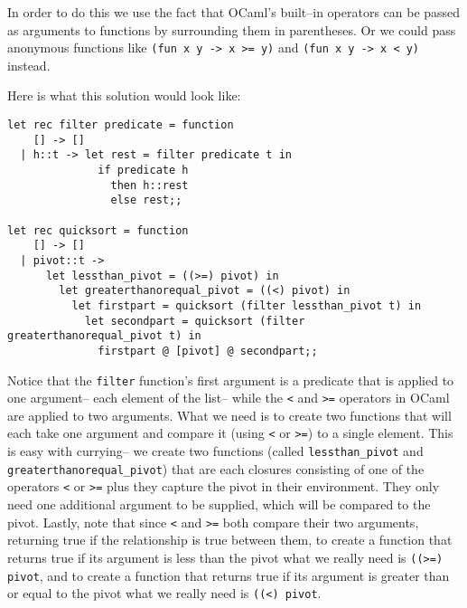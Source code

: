 \documentclass[11pt,fleqn]{article}
\begin{document}
\begin{enumerate}
          In order to do this we use the fact that OCaml's built--in
          operators can be passed as arguments to functions by surrounding
          them in parentheses.  Or we could pass anonymous functions like
          \texttt{(fun x y -> x >= y)} and \texttt{(fun x y -> x < y)}
          instead.

          Here is what this solution would look like:

          \vspace{-2.5mm}

          \begin{center}

            \begin{Verbatim}[gobble=0]
let rec filter predicate = function
    [] -> []
  | h::t -> let rest = filter predicate t in
              if predicate h
                then h::rest
                else rest;;

let rec quicksort = function
    [] -> []
  | pivot::t ->
      let lessthan_pivot = ((>=) pivot) in
        let greaterthanorequal_pivot = ((<) pivot) in
          let firstpart = quicksort (filter lessthan_pivot t) in
            let secondpart = quicksort (filter greaterthanorequal_pivot t) in
              firstpart @ [pivot] @ secondpart;;
            \end{Verbatim}

          \end{center}

          \vspace{-1mm}

          Notice that the \texttt{filter} function's first argument is a
          predicate that is applied to one argument-- each element of the
          list-- while the \texttt{<} and \texttt{>=} operators in OCaml are
          applied to two arguments.  What we need is to create two functions
          that will each take one argument and compare it (using \texttt{<}
          or \texttt{>=}) to a single element.  This is easy with currying--
          we create two functions (called \texttt{lessthan\_pivot} and
          \texttt{greaterthanorequal\_pivot}) that are each closures
          consisting of one of the operators \texttt{<} or \texttt{>=} plus
          they capture the pivot in their environment.  They only need one
          additional argument to be supplied, which will be compared to the
          pivot.  Lastly, note that since \texttt{<} and \texttt{>=} both
          compare their two arguments, returning true if the relationship is
          true between them, to create a function that returns true if its
          argument is less than the pivot what we really need is
          \texttt{((>=) pivot}, and to create a function that returns true
          if its argument is greater than or equal to the pivot what we
          really need is \texttt{((<) pivot}.


\end{enumerate}
\end{document}
